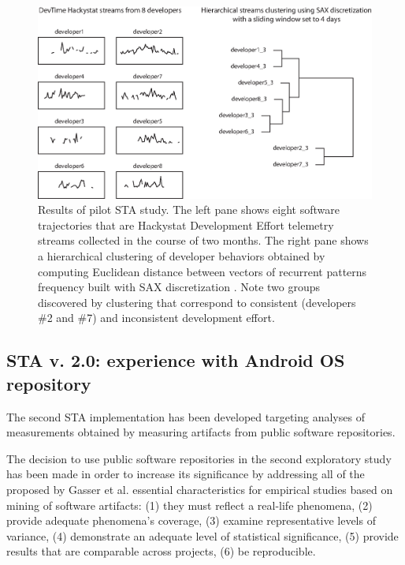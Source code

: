 \begin{figure}[t]
   \centering
   \includegraphics[width=145mm]{figures/STA1.eps}
   \caption{Results of pilot STA study. 
   The left pane shows eight software trajectories that are Hackystat Development Effort telemetry streams \cite{citeulike:557296} 
   collected in the course of two months.
   The right pane shows a hierarchical clustering of developer behaviors obtained by computing Euclidean distance between vectors
   of recurrent patterns frequency built with SAX discretization \cite{sax}. 
   Note two groups discovered by clustering that correspond to consistent (developers \#2 and \#7) and inconsistent development effort.}
   \label{fig:STA1-results}
\end{figure}


\subsection{STA v. 2.0: experience with Android OS repository}
The second STA implementation has been developed targeting analyses of measurements obtained by measuring artifacts 
from public software repositories.

The decision to use public software repositories in the second exploratory study has been made in order to increase its 
significance by addressing all of the proposed by Gasser et al. \cite{citeulike:13058334} essential characteristics for 
empirical studies based on mining of software artifacts:  
(1) they must reflect a real-life phenomena, 
(2) provide adequate phenomena's coverage, 
(3) examine representative levels of variance, 
(4) demonstrate an adequate level of statistical significance,
(5) provide results that are comparable across projects,
(6) be reproducible. 

